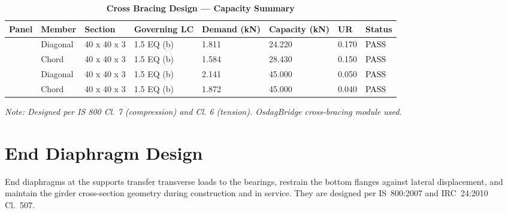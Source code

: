 \documentclass[12pt,a4paper]{report}
\numberwithin{table}{chapter}
\numberwithin{figure}{chapter}
\begin{document}
\vspace{1em}
\begin{longtable}{|C{2.0cm}|L{1.8cm}|C{2.2cm}|C{3.0cm}|C{1.8cm}|C{1.8cm}|C{1.2cm}|C{1.8cm}|}
\caption{\textbf{Cross Bracing Design --- Capacity Summary}}
\hline
\textbf{Panel} & \textbf{Member} & \textbf{Section} & \textbf{Governing LC} & \textbf{Demand (kN)} & \textbf{Capacity (kN)} & \textbf{UR} & \textbf{Status} \\[6pt]
\hline
{} & Diagonal & 40 x 40 x 3 & 1.5 EQ (b) & 1.811 & 24.220 & 0.170 & \textcolor{black}{PASS} \\[6pt]
 & Chord & 40 x 40 x 3 & 1.5 EQ (b) & 1.584 & 28.430 & 0.150 & \textcolor{black}{PASS} \\[6pt]
\hline
{} & Diagonal & 40 x 40 x 3 & 1.5 EQ (b) & 2.141 & 45.000 & 0.050 & \textcolor{black}{PASS} \\[6pt]
 & Chord & 40 x 40 x 3 & 1.5 EQ (b) & 1.872 & 45.000 & 0.040 & \textcolor{black}{PASS} \\[6pt]
\hline
\end{longtable}
\noindent\textit{Note: Designed per IS 800 Cl. 7 (compression) and Cl. 6 (tension). OsdagBridge cross-bracing module used.}

\section{End Diaphragm Design}
\label{sec:end-diaphragm}

End diaphragms at the supports transfer transverse loads to the bearings, restrain the bottom flanges against lateral displacement, and maintain the girder cross-section geometry during construction and in service. They are designed per IS~800:2007 and IRC~24:2010 Cl.~507.

\vspace{1em}

\vspace{0.4em}
\noindent
\setlength{\tabcolsep}{4pt}
\setlength{\LTleft}{0pt}
\setlength{\LTright}{\fill}
\end{document}
